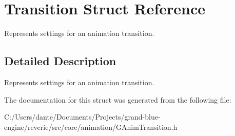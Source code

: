 \hypertarget{struct_transition}{}\section{Transition Struct Reference}
\label{struct_transition}


Represents settings for an animation transition.  




\subsection{Detailed Description}
Represents settings for an animation transition. 

The documentation for this struct was generated from the following file\+:\begin{DoxyCompactItemize}
\item 
C\+:/\+Users/dante/\+Documents/\+Projects/grand-\/blue-\/engine/reverie/src/core/animation/G\+Anim\+Transition.\+h\end{DoxyCompactItemize}
